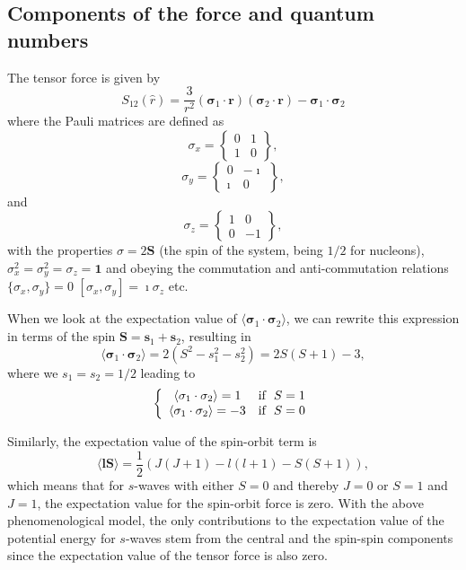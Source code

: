 \documentclass[graybox,sectrefs,envcountresetchap,open=right]{svmonodo}
\begin{document}
\noindent





\subsection{Components of the force and quantum numbers}

The tensor force is given by
\[
S_{12} (\hat r) = \frac{3}{r^2}\left(\mathbf{\sigma}_1\cdot \mathbf{r}\right) \left(\mathbf{\sigma}_2\cdot \mathbf{r}\right) -\mathbf{\sigma}_1\cdot\mathbf{\sigma}_2\]
where the Pauli matrices are defined as
\[
\sigma_x =\begin{Bmatrix} 0 & 1 \\ 1 & 0 \end{Bmatrix},
\]
\[
\sigma_y =\begin{Bmatrix} 0 & -\imath \\ \imath & 0 \end{Bmatrix},
\]
and
\[
\sigma_z =\begin{Bmatrix} 1 & 0 \\ 0 & -1 \end{Bmatrix},
\]
with the properties $\sigma = 2\mathbf{S}$ (the spin of the system, being $1/2$ for nucleons), 
$\sigma^2_x=\sigma^2_y=\sigma_z=\mathbf{1}$ and
obeying the commutation and anti-commutation relations $\{\sigma_x,\sigma_y\} =0$
$[\sigma_x,\sigma_y] =\imath\sigma_z$ etc.


When we look at the expectation value of 
$\langle \mathbf{\sigma}_1\cdot\mathbf{\sigma}_2\rangle$, we can rewrite this expression in terms of the
spin $\mathbf{S}=\mathbf{s}_1+\mathbf{s}_2$, resulting in 
\[
\langle\mathbf{\sigma}_1\cdot\mathbf{\sigma}_2\rangle=2(S^2-s_1^2-s_2^2)=2S(S+1)-3,
\]
where we $s_1=s_2=1/2$ leading to
\[
\left\{ \begin{array}{cc} \langle\mathbf{\sigma}_1\cdot\mathbf{\sigma}_2\rangle=1 &  \mathrm{if} \hspace{0.2cm} S=1\\
\langle\mathbf{\sigma}_1\cdot\mathbf{\sigma}_2\rangle=-3 & \mathrm{if} \hspace{0.2cm} S=0\\\end{array}\right.
\]




Similarly, the expectation value of the spin-orbit term is 
\[
\langle \mathbf{l}\mathbf{S} \rangle = \frac{1}{2}\left( J(J+1)-l(l+1)-S(S+1)\right),
\]
which means that for $s$-waves with either $S=0$ and thereby $J=0$ or $S=1$ and $J=1$, 
the expectation value for the
spin-orbit force is zero. With the above phenomenological model, the
only contributions to the expectation value of the potential energy for $s$-waves
stem  from the central and the spin-spin components since the
expectation value of the tensor force is also zero.
\end{document}
